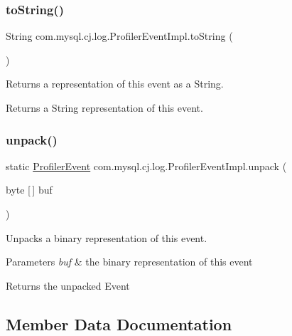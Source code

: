 \subsubsection{\texorpdfstring{to\+String()}{toString()}}
{\footnotesize\ttfamily String com.\+mysql.\+cj.\+log.\+Profiler\+Event\+Impl.\+to\+String (\begin{DoxyParamCaption}{ }\end{DoxyParamCaption})}

Returns a representation of this event as a String.

\begin{DoxyReturn}{Returns}
a String representation of this event. 
\end{DoxyReturn}
\mbox{\label{classcom_1_1mysql_1_1cj_1_1log_1_1_profiler_event_impl_aba1059ef66f8246a1e69d24af53dc9f0}} 
\subsubsection{\texorpdfstring{unpack()}{unpack()}}
{\footnotesize\ttfamily static \mbox{\hyperlink{interfacecom_1_1mysql_1_1cj_1_1log_1_1_profiler_event}{Profiler\+Event}} com.\+mysql.\+cj.\+log.\+Profiler\+Event\+Impl.\+unpack (\begin{DoxyParamCaption}\item[{byte \mbox{[}$\,$\mbox{]}}]{buf }\end{DoxyParamCaption})\hspace{0.3cm}{\ttfamily [static]}}

Unpacks a binary representation of this event.


\begin{DoxyParams}{Parameters}
{\em buf} & the binary representation of this event \\
\hline
\end{DoxyParams}
\begin{DoxyReturn}{Returns}
the unpacked Event 
\end{DoxyReturn}


\subsection{Member Data Documentation}
\mbox{\label{classcom_1_1mysql_1_1cj_1_1log_1_1_profiler_event_impl_ad98c4eaf20d8287d3ffe0ce846c29176}} 
